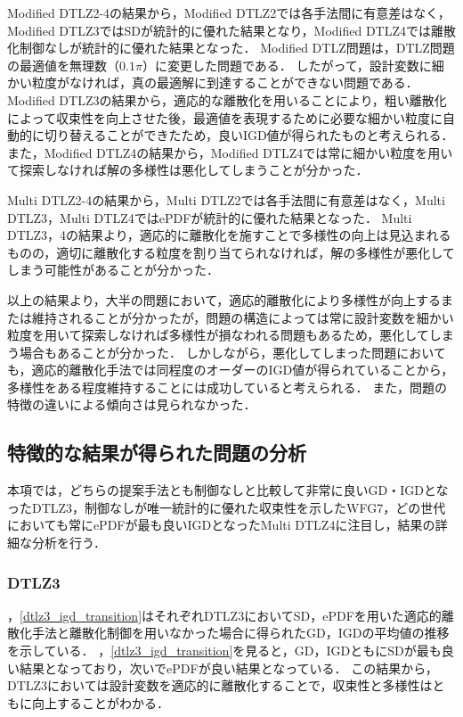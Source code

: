 \documentclass[../main/main]{subfiles}
\begin{document}
Modified DTLZ2-4の結果から，Modified DTLZ2では各手法間に有意差はなく，Modified DTLZ3ではSDが統計的に優れた結果となり，Modified DTLZ4では離散化制御なしが統計的に優れた結果となった．
Modified DTLZ問題は，DTLZ問題の最適値を無理数（$0.1\pi$）に変更した問題である．
したがって，設計変数に細かい粒度がなければ，真の最適解に到達することができない問題である．
Modified DTLZ3の結果から，適応的な離散化を用いることにより，粗い離散化によって収束性を向上させた後，最適値を表現するために必要な細かい粒度に自動的に切り替えることができたため，良いIGD値が得られたものと考えられる．
また，Modified DTLZ4の結果から，Modified DTLZ4では常に細かい粒度を用いて探索しなければ解の多様性は悪化してしまうことが分かった．

Multi DTLZ2-4の結果から，Multi DTLZ2では各手法間に有意差はなく，Multi DTLZ3，Multi DTLZ4ではePDFが統計的に優れた結果となった．
Multi DTLZ3，4の結果より，適応的に離散化を施すことで多様性の向上は見込まれるものの，適切に離散化する粒度を割り当てられなければ，解の多様性が悪化してしまう可能性があることが分かった．

以上の結果より，大半の問題において，適応的離散化により多様性が向上するまたは維持されることが分かったが，問題の構造によっては常に設計変数を細かい粒度を用いて探索しなければ多様性が損なわれる問題もあるため，悪化してしまう場合もあることが分かった．
しかしながら，悪化してしまった問題においても，適応的離散化手法では同程度のオーダーのIGD値が得られていることから，多様性をある程度維持することには成功していると考えられる．
また，問題の特徴の違いによる傾向さは見られなかった．

\subsection{特徴的な結果が得られた問題の分析}
\quad 本項では，どちらの提案手法とも制御なしと比較して非常に良いGD・IGDとなったDTLZ3，制御なしが唯一統計的に優れた収束性を示したWFG7，どの世代においても常にePDFが最も良いIGDとなったMulti DTLZ4に注目し，結果の詳細な分析を行う．

\subsubsection{DTLZ3}
，\ref{dtlz3_igd_transition}はそれぞれDTLZ3においてSD，ePDFを用いた適応的離散化手法と離散化制御を用いなかった場合に得られたGD，IGDの平均値の推移を示している．
，\ref{dtlz3_igd_transition}を見ると，GD，IGDともにSDが最も良い結果となっており，次いでePDFが良い結果となっている．
この結果から，DTLZ3においては設計変数を適応的に離散化することで，収束性と多様性はともに向上することがわかる．
\end{document}

